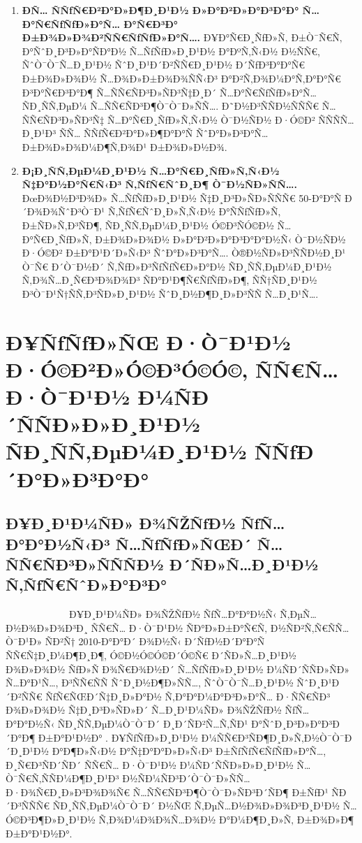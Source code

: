 \documentclass[12pt,A4]{report}
\begin{document}
\begin{enumerate}
  \item \textbf{Ð­Ñ… ÑÑƒÑ€Ð²Ð°Ð»Ð¶Ð¸Ð¹Ð½ Ð»Ð°Ð²Ð»Ð°Ð³Ð°Ð° Ñ…Ð°Ñ€ÑƒÑƒÐ»Ð°Ñ… Ð°Ñ€Ð³Ð° Ð±Ð¾Ð»Ð¾Ð²ÑÑ€ÑƒÑƒÐ»Ð°Ñ….}
        Ð¥Ð°Ñ€Ð¸ÑƒÐ»Ñ‚ Ð±Ò¯Ñ€Ñ‚ Ð°ÑˆÐ¸Ð³Ð»Ð°ÑÐ°Ð½ Ñ…ÑƒÑƒÐ»Ð¸Ð¹Ð½ Ð°ÐºÑ‚Ñ‹Ð½ Ð½ÑÑ€, ÑˆÒ¯Ò¯Ñ…Ð¸Ð¹Ð½ ÑˆÐ¸Ð¹Ð´Ð²ÑÑ€Ð¸Ð¹Ð½
        Ð´ÑƒÐ³Ð°Ð°Ñ€ Ð±Ð¾Ð»Ð¾Ð½ Ñ…Ð¾Ð»Ð±Ð¾Ð¾ÑÑ‹Ð³ Ð°Ð²Ñ‚Ð¾Ð¼Ð°Ñ‚Ð°Ð°Ñ€ Ð³Ð°Ñ€Ð³Ð°Ð¶ Ñ…ÑÑ€ÑÐ³Ð»ÑÐ³Ñ‡Ð¸Ð´ Ñ…Ð°Ñ€ÑƒÑƒÐ»Ð°Ñ…
        ÑÐ¸ÑÑ‚ÐµÐ¼ Ñ…ÑÑ€ÑÐ³Ð¶Ò¯Ò¯Ð»ÑÑ…. Ð˜Ð½Ð³ÑÑÐ½ÑÑÑ€ Ñ…ÑÑ€ÑÐ³Ð»ÑÐ³Ñ‡ Ñ…Ð°Ñ€Ð¸ÑƒÐ»Ñ‚Ñ‹Ð½ Ò¯Ð½ÑÐ½ Ð·Ó©Ð²
        ÑÑÑÑ…Ð¸Ð¹Ð³ ÑÑ… ÑÑƒÑ€Ð²Ð°Ð»Ð¶Ð°Ð°Ñ ÑˆÐ°Ð»Ð³Ð°Ñ… Ð±Ð¾Ð»Ð¾Ð¼Ð¶Ñ‚Ð¾Ð¹ Ð±Ð¾Ð»Ð½Ð¾.

  \item \textbf{Ð¡Ð¸ÑÑ‚ÐµÐ¼Ð¸Ð¹Ð½ Ñ…Ð°Ñ€Ð¸ÑƒÐ»Ñ‚Ñ‹Ð½ Ñ‡Ð°Ð½Ð°Ñ€Ñ‹Ð³ Ñ‚ÑƒÑ€ÑˆÐ¸Ð¶ Ò¯Ð½ÑÐ»ÑÑ….}
        ÐœÐ¾Ð½Ð³Ð¾Ð» Ñ…ÑƒÑƒÐ»Ð¸Ð¹Ð½ Ñ‡Ð¸Ð³Ð»ÑÐ»ÑÑÑ€ 50-Ð°Ð°Ñ Ð´Ð¾Ð¾ÑˆÐ³Ò¯Ð¹ Ñ‚ÑƒÑ€ÑˆÐ¸Ð»Ñ‚Ñ‹Ð½ Ð°ÑÑƒÑƒÐ»Ñ‚
        Ð±ÑÐ»Ñ‚Ð³ÑÐ¶, ÑÐ¸ÑÑ‚ÐµÐ¼Ð¸Ð¹Ð½ Ó©Ð³ÑÓ©Ð½ Ñ…Ð°Ñ€Ð¸ÑƒÐ»Ñ‚ Ð±Ð¾Ð»Ð¾Ð½ Ð»Ð°Ð²Ð»Ð°Ð³Ð°Ð°Ð½Ñ‹ Ò¯Ð½ÑÐ½ Ð·Ó©Ð²
        Ð±Ð°Ð¹Ð´Ð»Ñ‹Ð³ ÑˆÐ°Ð»Ð³Ð°Ñ…. Ò®Ð½ÑÐ»Ð³ÑÑÐ½Ð¸Ð¹ Ò¯Ñ€ Ð´Ò¯Ð½Ð´ Ñ‚ÑƒÐ»Ð³ÑƒÑƒÑ€Ð»Ð°Ð½ ÑÐ¸ÑÑ‚ÐµÐ¼Ð¸Ð¹Ð½
        Ñ‚Ð¾Ñ…Ð¸Ñ€Ð³Ð¾Ð¾Ð³ ÑÐ°Ð¹Ð¶Ñ€ÑƒÑƒÐ»Ð¶, ÑÑ†ÑÐ¸Ð¹Ð½ Ð³Ò¯Ð¹Ñ†ÑÑ‚Ð³ÑÐ»Ð¸Ð¹Ð½ ÑˆÐ¸Ð½Ð¶Ð¸Ð»Ð³ÑÑ Ñ…Ð¸Ð¹Ñ….
\end{enumerate}

\newpage
\chapter{Ð¥ÑƒÑƒÐ»ÑŒ Ð·Ò¯Ð¹Ð½ Ð·Ó©Ð²Ð»Ó©Ð³Ó©Ó©, ÑÑ€Ñ… Ð·Ò¯Ð¹Ð½ Ð¼ÑÐ´ÑÑÐ»Ð»Ð¸Ð¹Ð½ ÑÐ¸ÑÑ‚ÐµÐ¼Ð¸Ð¹Ð½ ÑÑƒÐ´Ð°Ð»Ð³Ð°Ð°}
\markboth{}{}
\thispagestyle{empty}

\section{Ð¥Ð¸Ð¹Ð¼ÑÐ» Ð¾ÑŽÑƒÐ½ ÑƒÑ…Ð°Ð°Ð½Ñ‹Ð³ Ñ…ÑƒÑƒÐ»ÑŒÐ´ Ñ…ÑÑ€ÑÐ³Ð»ÑÑÑÐ½ Ð´ÑÐ»Ñ…Ð¸Ð¹Ð½ Ñ‚ÑƒÑ€ÑˆÐ»Ð°Ð³Ð°}

\ \ \ \ \ \ \ \ \  \ \ \ \ Ð¥Ð¸Ð¹Ð¼ÑÐ» Ð¾ÑŽÑƒÐ½ ÑƒÑ…Ð°Ð°Ð½Ñ‹ Ñ‚ÐµÑ…Ð½Ð¾Ð»Ð¾Ð³Ð¸ ÑÑ€Ñ… Ð·Ò¯Ð¹Ð½ ÑÐ°Ð»Ð±Ð°Ñ€Ñ‚
Ð½ÑÐ²Ñ‚Ñ€ÑÑ… Ò¯Ð¹Ð» ÑÐ²Ñ† 2010-Ð°Ð°Ð´ Ð¾Ð½Ñ‹ Ð´ÑƒÐ½Ð´Ð°Ð°Ñ ÑÑ€Ñ‡Ð¸Ð¼Ð¶Ð¸Ð¶, Ó©Ð½Ó©Ó©Ð´Ó©Ñ€ Ð´ÑÐ»Ñ…Ð¸Ð¹Ð½ Ð¾Ð»Ð¾Ð½
ÑƒÐ»Ñ Ð¾Ñ€Ð¾Ð½Ð´ Ñ…ÑƒÑƒÐ»Ð¸Ð¹Ð½ Ð¼ÑÐ´ÑÑÐ»ÑÐ» Ñ…Ð°Ð¹Ñ…, Ð³ÑÑ€ÑÑ ÑˆÐ¸Ð½Ð¶Ð»ÑÑ…, ÑˆÒ¯Ò¯Ñ…Ð¸Ð¹Ð½ ÑˆÐ¸Ð¹Ð´Ð²ÑÑ€
ÑƒÑ€ÑŒÐ´Ñ‡Ð¸Ð»Ð°Ð½ Ñ‚Ð°Ð°Ð¼Ð°Ð³Ð»Ð°Ñ… Ð·ÑÑ€ÑÐ³ Ð¾Ð»Ð¾Ð½ Ñ‡Ð¸Ð³Ð»ÑÐ»Ð´ Ñ…Ð¸Ð¹Ð¼ÑÐ» Ð¾ÑŽÑƒÐ½ ÑƒÑ…Ð°Ð°Ð½Ñ‹ ÑÐ¸ÑÑ‚ÐµÐ¼Ò¯Ò¯Ð´
Ð¸Ð´ÑÐ²Ñ…Ñ‚ÑÐ¹ Ð°ÑˆÐ¸Ð³Ð»Ð°Ð³Ð´Ð°Ð¶ Ð±Ð°Ð¹Ð½Ð° \cite{surden2019artificial}. Ð¥ÑƒÑƒÐ»Ð¸Ð¹Ð½
Ð¼ÑÑ€Ð³ÑÐ¶Ð¸Ð»Ñ‚Ð½Ò¯Ò¯Ð´Ð¸Ð¹Ð½ Ð°Ð¶Ð»Ñ‹Ð½ Ð°Ñ‡Ð°Ð°Ð»Ð»Ñ‹Ð³ Ð±ÑƒÑƒÑ€ÑƒÑƒÐ»Ð°Ñ…, Ð¸Ñ€Ð³ÑÐ´ÑÐ´ ÑÑ€Ñ… Ð·Ò¯Ð¹Ð½ Ð¼ÑÐ´ÑÑÐ»Ð»Ð¸Ð¹Ð½
Ñ…Ò¯Ñ€Ñ‚ÑÑÐ¼Ð¶Ð¸Ð¹Ð³ Ð½ÑÐ¼ÑÐ³Ð´Ò¯Ò¯Ð»ÑÑ… Ð·Ð¾Ñ€Ð¸Ð»Ð³Ð¾Ð¾Ñ€ Ñ…ÑÑ€ÑÐ³Ð¶Ò¯Ò¯Ð»ÑÐ³Ð´ÑÐ¶ Ð±ÑƒÐ¹ ÑÐ´Ð³ÑÑÑ€ ÑÐ¸ÑÑ‚ÐµÐ¼Ò¯Ò¯Ð´
Ð½ÑŒ Ñ‚ÐµÑ…Ð½Ð¾Ð»Ð¾Ð³Ð¸Ð¹Ð½ Ñ…Ó©Ð³Ð¶Ð»Ð¸Ð¹Ð½ Ñ‚Ð¾Ð¼Ð¾Ð¾Ñ…Ð¾Ð½ Ð°Ð¼Ð¶Ð¸Ð»Ñ‚ Ð±Ð¾Ð»Ð¶ Ð±Ð°Ð¹Ð½Ð°.
\end{document}
